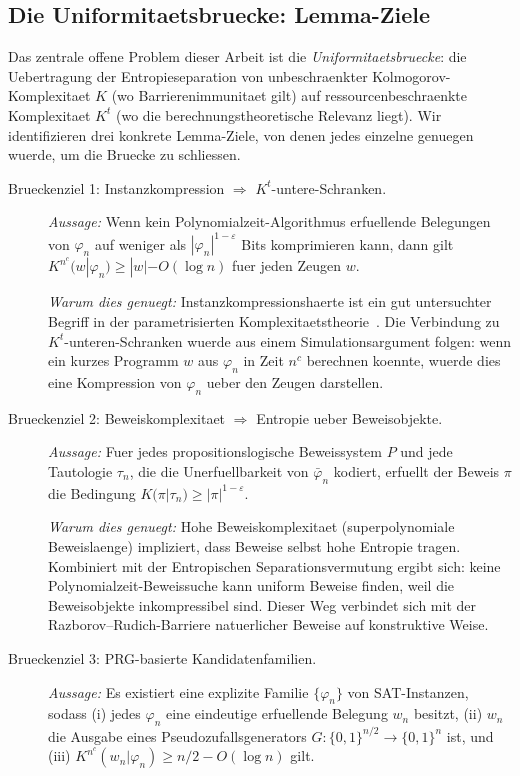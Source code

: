 \documentclass[aps,prd,twocolumn,superscriptaddress,nofootinbib]{revtex4-2}
\theoremstyle{definition}
\theoremstyle{remark}
\begin{document}
\subsection{Die Uniformitaetsbruecke: Lemma-Ziele}
\label{sec:uniformity-bridge}

Das zentrale offene Problem dieser Arbeit ist die \emph{Uniformitaetsbruecke}: die Uebertragung der Entropieseparation von unbeschraenkter Kolmogorov-Komplexitaet $K$ (wo Barrierenimmunitaet gilt) auf ressourcenbeschraenkte Komplexitaet $K^t$ (wo die berechnungstheoretische Relevanz liegt). Wir identifizieren drei konkrete Lemma-Ziele, von denen jedes einzelne genuegen wuerde, um die Bruecke zu schliessen.

\begin{description}
\item[Brueckenziel 1: Instanzkompression $\Rightarrow$ $K^t$-untere-Schranken.]
\emph{Aussage:} Wenn kein Polynomialzeit-Algorithmus erfuellende Belegungen von $\varphi_n$ auf weniger als $|\varphi_n|^{1-\varepsilon}$ Bits komprimieren kann, dann gilt $K^{n^c}(w | \varphi_n) \geq |w| - O(\log n)$ fuer jeden Zeugen $w$.

\emph{Warum dies genuegt:} Instanzkompressionshaerte ist ein gut untersuchter Begriff in der parametrisierten Komplexitaetstheorie~\cite{FortnowSanthanam2011,DellMelkebeek2014}. Die Verbindung zu $K^t$-unteren-Schranken wuerde aus einem Simulationsargument folgen: wenn ein kurzes Programm $w$ aus $\varphi_n$ in Zeit $n^c$ berechnen koennte, wuerde dies eine Kompression von $\varphi_n$ ueber den Zeugen darstellen.

\item[Brueckenziel 2: Beweiskomplexitaet $\Rightarrow$ Entropie ueber Beweisobjekte.]
\emph{Aussage:} Fuer jedes propositionslogische Beweissystem $P$ und jede Tautologie $\tau_n$, die die Unerfuellbarkeit von $\bar{\varphi}_n$ kodiert, erfuellt der Beweis $\pi$ die Bedingung $K(\pi | \tau_n) \geq |\pi|^{1-\varepsilon}$.

\emph{Warum dies genuegt:} Hohe Beweiskomplexitaet (superpolynomiale Beweislaenge) impliziert, dass Beweise selbst hohe Entropie tragen. Kombiniert mit der Entropischen Separationsvermutung ergibt sich: keine Polynomialzeit-Beweissuche kann uniform Beweise finden, weil die Beweisobjekte inkompressibel sind. Dieser Weg verbindet sich mit der Razborov--Rudich-Barriere natuerlicher Beweise auf konstruktive Weise.

\item[Brueckenziel 3: PRG-basierte Kandidatenfamilien.]
\emph{Aussage:} Es existiert eine explizite Familie $\{\varphi_n\}$ von SAT-Instanzen, sodass (i) jedes $\varphi_n$ eine eindeutige erfuellende Belegung $w_n$ besitzt, (ii) $w_n$ die Ausgabe eines Pseudozufallsgenerators $G: \{0,1\}^{n/2} \to \{0,1\}^n$ ist, und (iii) $K^{n^c}(w_n | \varphi_n) \geq n/2 - O(\log n)$ gilt.


\end{description}
\end{document}
